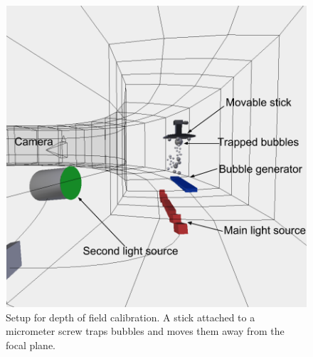 			
			\begin{figure}
				\centering
				\includegraphics[scale=.5]{images/depth_of_field_setup.png}
				\caption{Setup for depth of field calibration. A stick attached to a micrometer screw traps bubbles and moves them away from the focal plane.}
				\label{fig:depth_of_field_setup}
			\end{figure}
			
